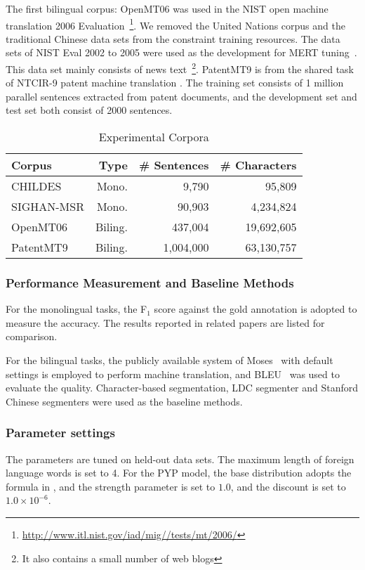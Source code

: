 \documentclass[11pt]{article}
\begin{document}
The first bilingual corpus: OpenMT06 was used in the NIST open machine translation 2006
Evaluation~\footnote{\url{http://www.itl.nist.gov/iad/mig//tests/mt/2006/}}. 
We removed the United Nations corpus and the traditional Chinese
data sets from the constraint training resources. The data sets of NIST
Eval 2002 to 2005 were used as the development for MERT
tuning~\cite{och2003minimum}.  This data set mainly consists of news
text~\footnote{It also contains a small number of web blogs}.  PatentMT9
is from the shared task of NTCIR-9 patent machine translation
. The training set consists of 1 million parallel sentences extracted from
patent documents, and the development set and test set both consist of
2000 sentences.

\begin{table}
{\small
\begin{center}
\begin{tabular}{|lrrr|}
\hline
\bf Corpus & \bf Type & \bf \# Sentences & \bf \# Characters  \\ 
\hline
CHILDES&   Mono. & 9,790 & 95,809\\
SIGHAN-MSR &  Mono. & 90,903 & 4,234,824 \\
\hline
OpenMT06 & Biling.  & 437,004 & 19,692,605 \\ 
PatentMT9 & Biling. & 1,004,000 & 63,130,757 \\
\hline
\end{tabular}
\end{center}
}
\caption{\label{tab:dataset} Experimental Corpora}
\end{table}

\subsubsection{Performance Measurement and Baseline Methods}
For the monolingual tasks, the F$_1$ score against the gold annotation
is adopted to measure the accuracy.  The results reported in related
papers are listed for comparison.

For the bilingual tasks, the publicly available system of
Moses~\cite{koehn2007moses} with default settings is employed to perform
machine translation, and BLEU~\cite{papineni2002bleu} was used to
evaluate the quality. Character-based segmentation, LDC segmenter and
Stanford Chinese segmenters were used as the baseline methods.

\subsubsection{Parameter settings}
The parameters are tuned on held-out data sets.  The maximum length of foreign language words is set to 4.  For the PYP model,  the base distribution adopts the formula  in \cite{chung2009unsupervised}, and the strength parameter is set to $1.0$, and the discount is set to $1.0 \times 10^{-6}$.
\end{document}
